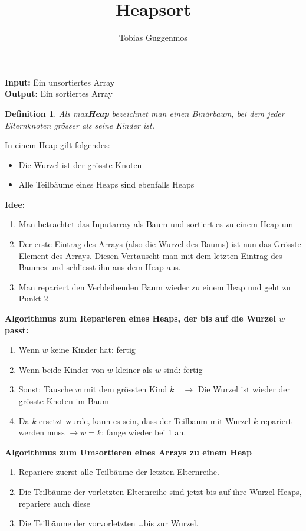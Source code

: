 \documentclass[11pt,a4paper]{article}
\title{Heapsort}
\author{Tobias Guggenmos}
\numberwithin{equation}{section}
\numberwithin{figure}{section}
\newtheorem{Def}{Definition}
\begin{document}
\maketitle
\begin{tabbing}
\=\textbf{Input:} \hspace{1cm}\=Ein unsortiertes Array\\
\>\textbf{Output:} \>Ein sortiertes Array

\end{tabbing}

\begin{Def}
	Als max\textbf{Heap} bezeichnet man einen Bin\"arbaum, bei dem jeder Elternknoten gr\"osser als seine Kinder ist.
\end{Def}
In einem Heap gilt folgendes:
\begin{itemize}
\item Die Wurzel ist der gr\"osste Knoten
\item Alle Teilb\"aume eines Heaps sind ebenfalls Heaps
\end{itemize}
\textbf{Idee:}
\begin{enumerate}
\item Man betrachtet das Inputarray als Baum und sortiert es zu einem Heap um
\item Der erste Eintrag des Arrays (also die Wurzel des Baums) ist nun das Gr\"osste Element des Arrays. Diesen Vertauscht man mit dem letzten Eintrag des Baumes und schliesst ihn aus dem Heap aus.
\item Man repariert den Verbleibenden Baum wieder zu einem Heap und geht zu Punkt 2
\end{enumerate}
\textbf{Algorithmus zum Reparieren eines Heaps, der bis auf die Wurzel $w$ passt:}

\begin{enumerate}
\item Wenn $w$ keine Kinder hat: fertig
\item Wenn beide Kinder von $w$ kleiner als $w$ sind: fertig
\item Sonst: Tausche $w$ mit dem gr\"ossten Kind $k\quad\rightarrow$ Die Wurzel  ist wieder der gr\"osste Knoten im Baum
\item Da $k$ ersetzt wurde, kann es sein, dass der Teilbaum mit Wurzel $k$ repariert werden muss $\rightarrow w=k$; fange wieder bei 1 an.
\end{enumerate}
\textbf{Algorithmus zum Umsortieren eines Arrays zu einem Heap}
\begin{enumerate}
\item Repariere zuerst alle Teilb\"aume der letzten Elternreihe.
\item Die Teilb\"aume der vorletzten Elternreihe sind jetzt bis auf ihre Wurzel Heaps, repariere auch diese
\item Die Teilb\"aume der vorvorletzten \dots bis zur Wurzel. 
\end{enumerate}
\end{document}
